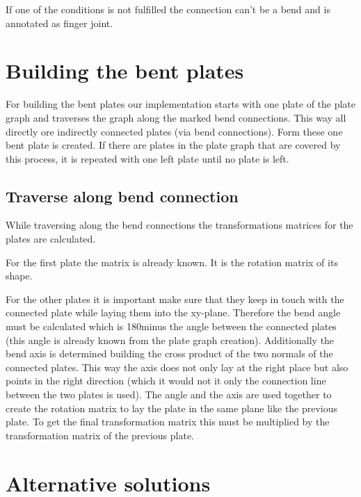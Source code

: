 \documentclass[../ClassicThesis.tex]{subfiles}
\begin{document}
If one of the conditions is not fulfilled the connection can't be a bend and is annotated as finger joint.

\section{Building the bent plates}
For building the bent plates our implementation starts with one plate of the plate graph and traverses the graph along the marked bend connections. This way all directly ore indirectly connected plates (via bend connections). Form these one bent plate is created. If there are plates in the plate graph that are covered by this process, it is repeated with one left plate until no plate is left.

\subsection{Traverse along bend connection}

While traversing along the bend connections the transformations matrices for the plates are calculated.

For the first plate the matrix is already known. It is the rotation matrix of its shape.

For the other plates it is important make sure that they keep in touch with the connected plate while laying them into the xy-plane. Therefore the bend angle must be calculated which is 180\textdegree  minus the angle between the connected plates (this angle is already known from the plate graph creation). Additionally the bend axis is determined building the cross product of the two normals of the connected plates. This way the axis does not only lay at the right place but also points in the right direction (which it would not it only the connection line between the two plates is used). The angle and the axis are used together to create the rotation matrix to lay the plate in the same plane like the previous plate. To get the final transformation matrix this must be multiplied by the transformation matrix of the previous plate.

\section{Alternative solutions}
\end{document}
